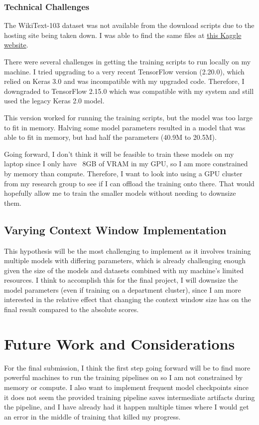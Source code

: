 \documentclass[11pt]{article}
\begin{document}
\subsubsection{Technical Challenges}
The WikiText-103 dataset was not available from the download scripts due to the hosting site being taken down. I was able to find the same files at \hyperlink{https://www.kaggle.com/datasets/rohitgr/wikitext}{this Kaggle website}.

There were several challenges in getting the training scripts to run locally on my machine. I tried upgrading to a very recent TensorFlow version (2.20.0), which relied on Keras 3.0 and was incompatible with my upgraded code. Therefore, I downgraded to TensorFlow 2.15.0 which was compatible with my system and still used the legacy Keras 2.0 model. 

This version worked for running the training scripts, but the model was too large to fit in memory. Halving some model parameters resulted in a model that was able to fit in memory, but had half the parameters (40.9M to 20.5M).

Going forward, I don't think it will be feasible to train these models on my laptop since I only have ~8GB of VRAM in my GPU, so I am more constrained by memory than compute. Therefore, I want to look into using a GPU cluster from my research group to see if I can offload the training onto there. That would hopefully allow me to train the smaller models without needing to downsize them.

\subsection{Varying Context Window Implementation}

This hypothesis will be the most challenging to implement as it involves training multiple models with differing parameters, which is already challenging enough given the size of the models and datasets combined with my machine's limited resources. I think to accomplish this for the final project, I will downsize the model parameters (even if training on a department cluster), since I am more interested in the relative effect that changing the context window size has on the final result compared to the absolute scores.

\section{Future Work and Considerations}
For the final submission, I think the first step going forward will be to find more powerful machines to run the training pipelines on so I am not constrained by memory or compute. I also want to implement frequent model checkpoints since it does not seem the provided training pipeline saves intermediate artifacts during the pipeline, and I have already had it happen multiple times where I would get an error in the middle of training that killed my progress.
\end{document}
